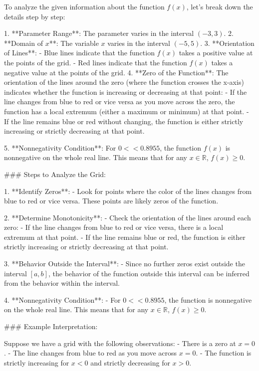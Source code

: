 To analyze the given information about the function \( f(x) \), let's break down the details step by step:

1. **Parameter Range**: The parameter varies in the interval \((-3, 3)\).
2. **Domain of \( x \)**: The variable \( x \) varies in the interval \((-5, 5)\).
3. **Orientation of Lines**: 
   - Blue lines indicate that the function \( f(x) \) takes a positive value at the points of the grid.
   - Red lines indicate that the function \( f(x) \) takes a negative value at the points of the grid.
4. **Zero of the Function**: The orientation of the lines around the zero (where the function crosses the x-axis) indicates whether the function is increasing or decreasing at that point:
   - If the line changes from blue to red or vice versa as you move across the zero, the function has a local extremum (either a maximum or minimum) at that point.
   - If the line remains blue or red without changing, the function is either strictly increasing or strictly decreasing at that point.

5. **Nonnegativity Condition**: For \( 0 < < 0.8955 \), the function \( f(x) \) is nonnegative on the whole real line. This means that for any \( x \in \mathbb{R} \), \( f(x) \geq 0 \).

### Steps to Analyze the Grid:

1. **Identify Zeros**:
   - Look for points where the color of the lines changes from blue to red or vice versa. These points are likely zeros of the function.

2. **Determine Monotonicity**:
   - Check the orientation of the lines around each zero:
     - If the line changes from blue to red or vice versa, there is a local extremum at that point.
     - If the line remains blue or red, the function is either strictly increasing or strictly decreasing at that point.

3. **Behavior Outside the Interval**:
   - Since no further zeros exist outside the interval \([a, b]\), the behavior of the function outside this interval can be inferred from the behavior within the interval.

4. **Nonnegativity Condition**:
   - For \( 0 < < 0.8955 \), the function is nonnegative on the whole real line. This means that for any \( x \in \mathbb{R} \), \( f(x) \geq 0 \).

### Example Interpretation:

Suppose we have a grid with the following observations:
- There is a zero at \( x = 0 \).
- The line changes from blue to red as you move across \( x = 0 \).
- The function is strictly increasing for \( x < 0 \) and strictly decreasing for \( x > 0 \).


